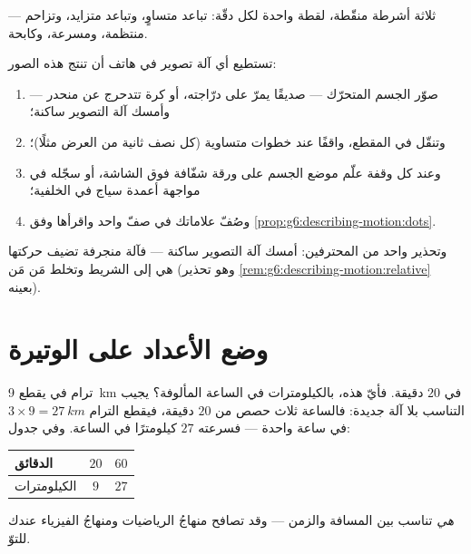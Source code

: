 \begin{omfigure}

{\small ثلاثة أشرطة منقّطة، لقطة واحدة لكل دقّة: تباعد متساوٍ،
وتباعد متزايد، وتزاحم --- منتظمة، ومسرعة، وكابحة.}
\end{omfigure}

\begin{method}\label{met:g6:describing-motion:film}
تستطيع أي آلة تصوير في هاتف أن تنتج هذه الصور:
\begin{enumerate}
  \item صوّر الجسم المتحرّك --- صديقًا يمرّ على درّاجته، أو كرة
        تتدحرج عن منحدر --- وأمسك آلة التصوير ساكنة؛
  \item وتنقّل في المقطع، واقفًا عند خطوات متساوية (كل نصف ثانية
        من العرض مثلًا)؛
  \item وعند كل وقفة علّم موضع الجسم على ورقة شفّافة فوق
        الشاشة، أو سجّله في مواجهة أعمدة سياج في الخلفية؛
  \item وصُفّ علاماتك في صفّ واحد واقرأها
        وفق \cref{prop:g6:describing-motion:dots}.
\end{enumerate}
وتحذير واحد من المحترفين: أمسك آلة التصوير ساكنة --- فآلة
منجرفة تضيف حركتها هي إلى الشريط وتخلط  مَن  مَن (وهو
تحذير \cref{rem:g6:describing-motion:relative} بعينه).
\end{method}

\section{وضع الأعداد على الوتيرة}

\begin{example}\label{ex:g6:describing-motion:proportion}
ترام في  يقطع \qty{9}{km} في $20$ دقيقة. فأيّ 
هذه، بالكيلومترات في الساعة المألوفة؟ يجيب التناسب بلا آلة
جديدة: فالساعة ثلاث حصص من $20$ دقيقة، فيقطع الترام
$3 \times 9 = \qty{27}{km}$ في ساعة واحدة --- فسرعته $27$
كيلومترًا في الساعة. وفي جدول:
\begin{center}
\begin{tabular}{l|cc}
الدقائق & $20$ & $60$ \\
\hline
الكيلومترات & $9$ & $27$
\end{tabular}
\end{center}
 \emph{هي} تناسب بين المسافة والزمن --- وقد
تصافح منهاجُ الرياضيات ومنهاجُ الفيزياء عندك للتوّ.
\end{example}

